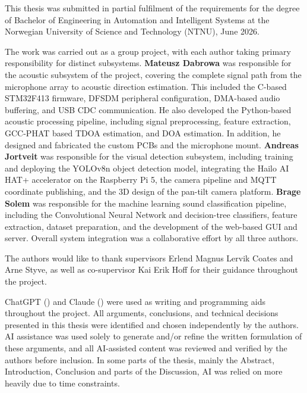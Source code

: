 This thesis was submitted in partial fulfilment of the requirements for the 
degree of Bachelor of Engineering in Automation and Intelligent Systems at 
the Norwegian University of Science and Technology (NTNU), June 2026.

\vspace{1em}

The work was carried out as a group project, with each author taking primary 
responsibility for distinct subsystems. \textbf{Mateusz Dabrowa} was responsible for the acoustic subsystem of the project, covering the complete signal path from the microphone array to acoustic direction estimation. This included the C-based STM32F413 firmware, DFSDM peripheral configuration, DMA-based audio buffering, and USB CDC communication. He also developed the Python-based acoustic processing pipeline, including signal preprocessing, feature extraction, GCC-PHAT based TDOA estimation, and DOA estimation. In addition, he designed and fabricated the custom PCBs and the microphone mount. \textbf{Andreas Jortveit} was responsible for the visual 
detection subsystem, including training and deploying the YOLOv8n object 
detection model, integrating the Hailo AI HAT+ accelerator on the Raspberry 
Pi 5, the camera pipeline and MQTT coordinate publishing, and the 3D design 
of the pan-tilt camera platform. \textbf{Brage Solem} was responsible for the 
machine learning sound classification pipeline, including the Convolutional 
Neural Network and decision-tree classifiers, feature extraction, dataset 
preparation, and the development of the web-based GUI and server. Overall 
system integration was a collaborative effort by all three authors.

\vspace{1em}

The authors would like to thank supervisors Erlend Magnus Lervik Coates and Arne Styve, as well as
co-supervisor Kai Erik Hoff for their guidance throughout the project.

\vspace{1em}

ChatGPT (\cite{chatgpt2026}) and Claude (\cite{anthropic2026}) were used as 
writing and programming aids throughout the project. All arguments, 
conclusions, and technical decisions presented in this thesis were identified 
and chosen independently by the authors. AI assistance was used solely to 
generate and/or refine the written formulation of these arguments, and all 
AI-assisted content was reviewed and verified by the authors before inclusion. In some parts of the thesis, mainly the Abstract, Introduction, Conclusion and parts of the Discussion, AI was relied on more heavily due to time constraints. 